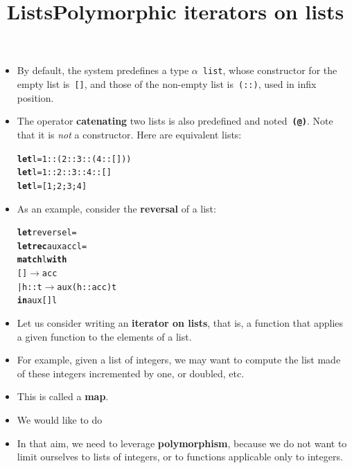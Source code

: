 \documentclass[wide]{slides}
\begin{document}
\begin{slide}
  \title{Lists}

  \begin{itemize}

    \item By default, the \OCaml system predefines a type
      \(\alpha\)~\texttt{list}, whose constructor for the empty list
      is~\texttt{[]}, and those of the non\hyp{}empty list
      is~\texttt{(::)}, used in infix position.

    \item The operator \textbf{catenating} two lists is also
      predefined and noted~\textbf{\texttt{(@)}}. Note that it is
      \emph{not} a constructor. Here are equivalent lists:
      \smallskip
\begin{alltt}
\textbf{let} l = 1::(2::3::(4::[]))
\textbf{let} l = 1::2::3::4::[]
\textbf{let} l = [1;2;3;4]
\end{alltt}

    \item As an example, consider the \textbf{reversal} of a list:
      \smallskip
\begin{alltt}
\textbf{let} reverse l =
  \textbf{let rec} aux acc l =
    \textbf{match} l \textbf{with}
         [] \(\rightarrow\) acc
    | h::t \(\rightarrow\) aux (h::acc) t
  \textbf{in} aux [] l
\end{alltt}

\end{itemize}

\end{slide}

\begin{slide}
  \title{Polymorphic iterators on lists}

  \begin{itemize}

    \item Let us consider writing an \textbf{iterator on lists}, that
      is, a function that applies a given function to the elements of
      a list.

    \item For example, given a list of integers, we may want to
      compute the list made of these integers incremented by one, or
      doubled, etc.

    \item This is called a \textbf{map}.

    \item We would like to do

      \smallskip
      \noindent{}

      \noindent{}

    \item In that aim, we need to leverage \textbf{polymorphism},
      because we do not want to limit ourselves to lists of integers,
      or to functions applicable only to integers.

  \end{itemize}

\end{slide}
\end{document}
